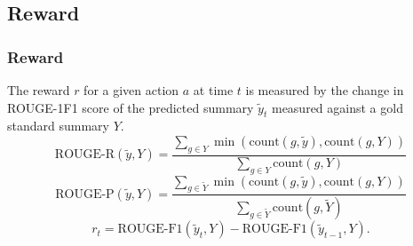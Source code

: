 \documentclass[]{beamer}
\begin{document}
	\subsection{Reward}
	\begin{frame}
			\frametitle{Reward}
				The reward $r$ for a given action $a$ at time $t$ is measured by the change in ROUGE-1F1 score of the predicted summary $\tilde{y}_{t}$ measured against a gold standard summary $Y$. 
	\begin{equation}
		 \textrm{ROUGE-R}(\tilde{y}, Y) = 
		    \frac{\sum_{g \in Y} 
		    \min \left(\textrm{count}(g, \tilde{y}), \textrm{count}(g, Y)\right)}{
		    \sum_{g \in Y} 
		    \textrm{count}(g, Y)
	    }
	\end{equation}
	\begin{equation}
		 \textrm{ROUGE-P}(\tilde{y}, Y) = 
		    \frac{\sum_{g \in \tilde{Y}} 
		    \min \left(\textrm{count}(g, \tilde{y}), \textrm{count}(g, Y)\right)}{
		    \sum_{g \in \tilde{Y}} 
		    \textrm{count}(g, \tilde{Y})
	    }
	\end{equation}
				\begin{equation}
					r_t = \textrm{ROUGE-F1}(\tilde{y}_{t}, Y) -  \textrm{ROUGE-F1}(\tilde{y}_{t-1}, Y).
				\end{equation}
	\end{frame}
\end{document}
